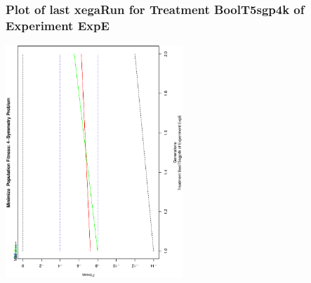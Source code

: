  \begin{frame}
 \frametitle{ Plot of last xegaRun for Treatment BoolT5sgp4k of Experiment ExpE }
 \begin{center}
\includegraphics[width=0.5\textwidth, angle=-90]
{ExpEPlotPopStatsFigure007.eps}
 \end{center}
 \label{report/ExpEPlotPopStatsFigure007.eps}  
 \end{frame}

